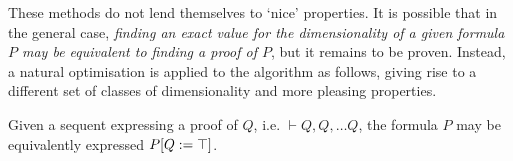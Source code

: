     \begin{remark*}
        These methods do not lend themselves to `nice' properties.
        It is possible that in the general case, \textit{finding an exact value for the dimensionality of a given formula $P$ may be equivalent to finding a proof of $P$}, but it remains to be proven.
        Instead, a natural optimisation is applied to the algorithm as follows, giving rise to a different set of classes of dimensionality and more pleasing properties.
    \end{remark*} 

    \begin{definition*}
         Given a sequent expressing a proof of $Q$, i.e. $\vdash Q, Q, \ldots Q$, the formula $P$ may be equivalently expressed $P[Q := \top]$.
    \end{definition*}

